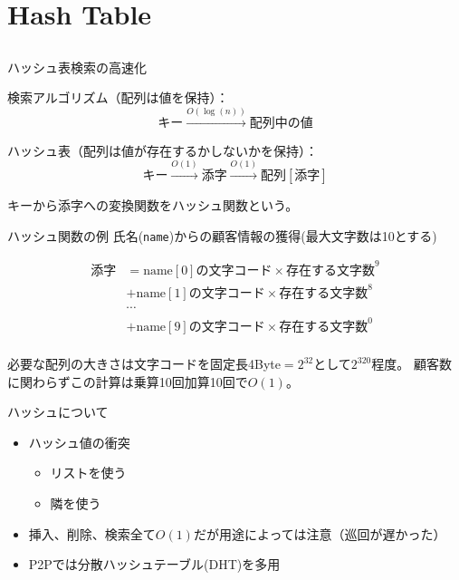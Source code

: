 \documentclass{beamer}
\subtitle{データ構造とアルゴリズム}
\begin{document}
\begin{frame}[fragile]{}
\titlepage
\end{frame}

\section{Hash Table}		%
\subsection{}

\begin{frame}[fragile]{ハッシュ表}{検索の高速化}

検索アルゴリズム（配列は値を保持）：
\[
キー \stackrel{O(\log(n))}{\longrightarrow} 配列中の値
\]

\vfill
ハッシュ表（配列は値が存在するかしないかを保持）：
\[
キー \stackrel{O(1)}{\longrightarrow} 添字 \stackrel{O(1)}{\longrightarrow} 配列[添字]
\]

\vfill
キーから添字への変換関数をハッシュ関数という。
\end{frame}

\begin{frame}[fragile]{ハッシュ関数の例}{}
氏名(\texttt{name})からの顧客情報の獲得(最大文字数は10とする)

\begin{align*}
添字
&= \text{name}[0]の文字コード\times \text{存在する文字数}^{9}\\
&+ \text{name}[1]の文字コード\times \text{存在する文字数}^{8}\\
& \cdots \\ 
&+ \text{name}[9]の文字コード\times \text{存在する文字数}^{0}\\
\end{align*}

必要な配列の大きさは文字コードを固定長4Byte$=2^{32}$として$2^{320}$程度。
顧客数に関わらずこの計算は乗算10回加算10回で$O(1)$。
\end{frame}

\begin{frame}[fragile]{ハッシュについて}{}
\begin{itemize}\itemsep8pt
\item ハッシュ値の衝突
\begin{itemize}\itemsep8pt
\item リストを使う
\item 隣を使う
\end{itemize}
\item 挿入、削除、検索全て$O(1)$だが用途によっては注意（巡回が遅かった）
\item P2Pでは分散ハッシュテーブル(DHT)を多用
\end{itemize}
\end{frame}
\end{document}
